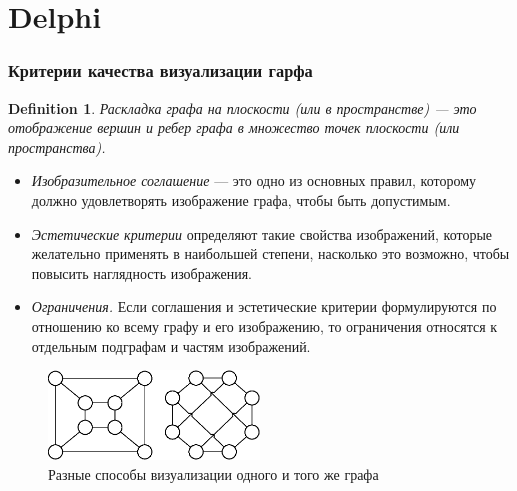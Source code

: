 \documentclass{beamer}
\begin{document}
\section{Delphi}
\begin{frame}
\frametitle{Критерии качества визуализации гарфа}
\tiny{
	\newtheorem{vis}{Definition}
	\begin{vis}
	Раскладка графа на плоскости (или в пространстве) — это отображение вершин и ребер графа в множество точек плоскости (или пространства).
	\end{vis}

	\begin{itemize}
	\item \textit{Изобразительное соглашение} — это одно из основных правил, которому должно удовлетворять изображение графа, чтобы быть допустимым.

	\item \textit{Эстетические критерии} определяют такие свойства изображений, которые желательно применять в наибольшей степени, насколько это возможно, чтобы повысить наглядность изображения.

	\item \textit{Ограничения.} Если соглашения и эстетические критерии формулируются по отношению ко всему графу и его изображению, то ограничения относятся к отдельным подграфам и частям изображений.
\end{itemize}

	\begin{figure}[htbp]
		\centering
			\includegraphics[width=0.50\textwidth]{Pic/Pic1.eps}
		\caption{Разные способы визуализации одного и того же графа}
		\label{fig:VisExample}
	\end{figure}
}
\end{frame}

\end{document}
